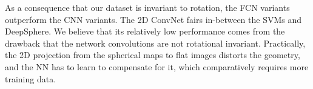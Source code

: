 \documentclass{article} %
\newcommand{\secref}[1]{Section~\ref{sec:#1}}
\newcommand{\1}{\b{1}}              %
\newcommand{\0}{\b{0}}              %
\begin{document}
As a consequence that our dataset is invariant to rotation, the FCN variants outperform the CNN variants.
The 2D ConvNet fairs in-between the SVMs and DeepSphere.
We believe that its relatively low performance comes from the drawback that the network convolutions are not rotational invariant.
Practically, the 2D projection from the spherical maps to flat images distorts the geometry, and the NN has to learn to compensate for it, which comparatively requires more training data.


\end{document}
